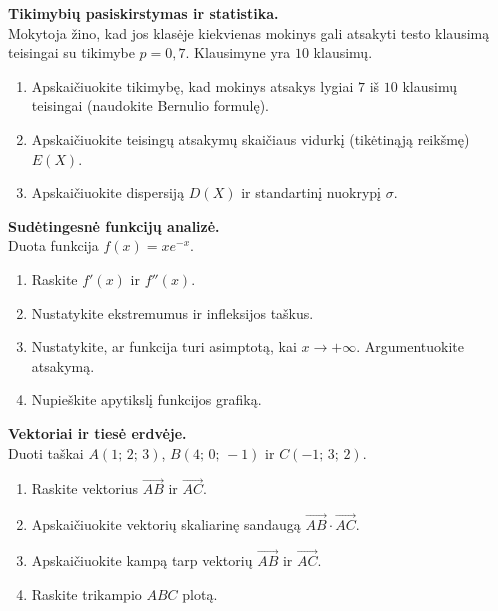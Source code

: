 \begin{exercise}
\textbf{Tikimybių pasiskirstymas ir statistika.}\\
Mokytoja žino, kad jos klasėje kiekvienas mokinys gali atsakyti testo
klausimą teisingai su tikimybe $p = 0{,}7$. Klausimyne yra $10$ klausimų.
\begin{enumerate}[label=\arabic*.]
  \item Apskaičiuokite tikimybę, kad mokinys atsakys lygiai $7$ iš $10$
        klausimų teisingai (naudokite Bernulio formulę).
  \item Apskaičiuokite teisingų atsakymų skaičiaus vidurkį (tikėtinąją
        reikšmę) $E(X)$.
  \item Apskaičiuokite dispersiją $D(X)$ ir standartinį nuokrypį $\sigma$.
\end{enumerate}
\end{exercise}

\begin{exercise}
\textbf{Sudėtingesnė funkcijų analizė.}\\
Duota funkcija $f(x) = xe^{-x}$.
\begin{enumerate}[label=\arabic*.]
  \item Raskite $f'(x)$ ir $f''(x)$.
  \item Nustatykite ekstremumus ir infleksijos taškus.
  \item Nustatykite, ar funkcija turi asimptotą, kai $x \to +\infty$.
        Argumentuokite atsakymą.
  \item Nupieškite apytikslį funkcijos grafiką.
\end{enumerate}
\end{exercise}

\begin{exercise}
\textbf{Vektoriai ir tiesė erdvėje.}\\
Duoti taškai $A(1;\,2;\,3)$, $B(4;\,0;\,-1)$ ir $C(-1;\,3;\,2)$.
\begin{enumerate}[label=\arabic*.]
  \item Raskite vektorius $\overrightarrow{AB}$ ir $\overrightarrow{AC}$.
  \item Apskaičiuokite vektorių skaliarinę sandaugą
        $\overrightarrow{AB} \cdot \overrightarrow{AC}$.
  \item Apskaičiuokite kampą tarp vektorių $\overrightarrow{AB}$ ir
        $\overrightarrow{AC}$.
  \item Raskite trikampio $ABC$ plotą.
\end{enumerate}
\end{exercise}

